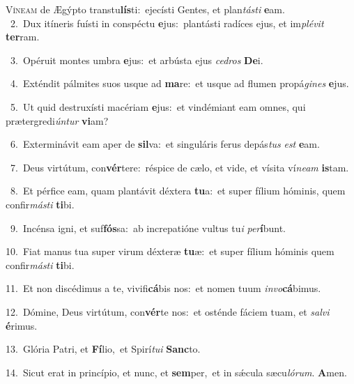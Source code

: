 \lettrine{\initial\textcolor{\initialcolor}{V}}{íneam} de Ægýpto transtu\-\textbf{lís}\-ti:~\star ejecísti Gentes, et plan\-\textit{tás}\-\textit{ti} \textbf{e}\-am.\\
{\numbfont\textcolor{\numbcolor}{~2.}}~Dux itíneris fuísti in conspéctu \textbf{e}\-jus:~\star plantásti radíces ejus, et im\-\textit{plé}\-\textit{vit} \textbf{ter}\-ram.\par
{\numbfont\textcolor{\numbcolor}{~3.}}~Opéruit montes umbra \textbf{e}\-jus:~\star et arbústa ejus \textit{ce}\-\textit{dros} \textbf{De}\-i.\par
{\numbfont\textcolor{\numbcolor}{~4.}}~Exténdit pálmites suos usque ad \textbf{ma}\-re:~\star et usque ad flumen propá\-\textit{gi}\-\textit{nes} \textbf{e}\-jus.\par
{\numbfont\textcolor{\numbcolor}{~5.}}~Ut quid destruxísti macériam \textbf{e}\-jus:~\star et vindémiant eam omnes, qui prætergredi\-\textit{ún}\-\textit{tur} \textbf{vi}\-am?\par
{\numbfont\textcolor{\numbcolor}{~6.}}~Exterminávit eam aper de \textbf{sil}\-va:~\star et singuláris ferus depás\textit{tus} \textit{est} \textbf{e}\-am.\par
{\numbfont\textcolor{\numbcolor}{~7.}}~Deus virtútum, con\-\textbf{vér}\-tere:~\star réspice de cælo, et vide, et vísita ví\-\textit{ne}\-\textit{am} \textbf{is}\-tam.\par
{\numbfont\textcolor{\numbcolor}{~8.}}~Et pérfice eam, quam plantávit déxtera \textbf{tu}\-a:~\star et super fílium hóminis, quem confir\-\textit{más}\-\textit{ti} \textbf{ti}\-bi.\par
{\numbfont\textcolor{\numbcolor}{~9.}}~Incénsa igni, et suf\-\textbf{fós}\-sa:~\star ab increpatióne vultus tu\textit{i} \textit{per}\-\textbf{í}bunt.\par
{\numbfont\textcolor{\numbcolor}{10.}}~Fiat manus tua super virum déxteræ \textbf{tu}\-æ:~\star et super fílium hóminis quem confir\-\textit{más}\-\textit{ti} \textbf{ti}\-bi.\par
{\numbfont\textcolor{\numbcolor}{11.}}~Et non discédimus a te, vivifi\-\textbf{cá}\-bis nos:~\star et nomen tuum \textit{in}\-\textit{vo}\textbf{cá}bimus.\par
{\numbfont\textcolor{\numbcolor}{12.}}~Dómine, Deus virtútum, con\-\textbf{vér}\-te nos:~\star et osténde fáciem tuam, et \textit{sal}\-\textit{vi} \textbf{é}\-rimus.\par
{\numbfont\textcolor{\numbcolor}{13.}}~Glória Patri, et \textbf{Fí}\-lio,~\star et Spirí\-\textit{tu}\-\textit{i} \textbf{Sanc}\-to.\par
{\numbfont\textcolor{\numbcolor}{14.}}~Sicut erat in princípio, et nunc, et \textbf{sem}\-per,~\star et in sǽcula sæcu\-\textit{ló}\-\textit{rum}. \textbf{A}\-men.\par
